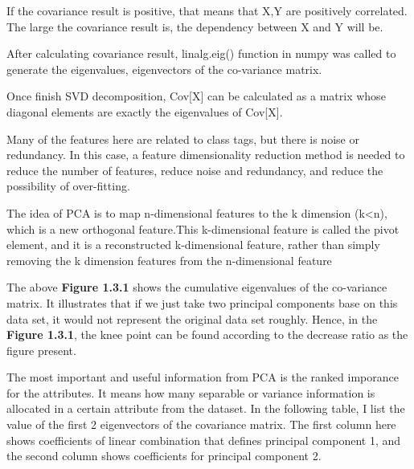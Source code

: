 \documentclass[titlepage,a4paper,12pt,thmsb]{report}
\begin{document}
If the covariance result is positive, that means that X,Y are positively correlated. The large the covariance result is, the dependency between X and Y will be.

After calculating covariance result, {linalg.eig()} function in {numpy} was called to generate the eigenvalues, eigenvectors of the co-variance matrix.

Once finish SVD decomposition, Cov[X] can be calculated as a matrix whose diagonal elements are exactly the eigenvalues of Cov[X].

Many of the features here are related to class tags, but there is noise or redundancy. In this case, a feature dimensionality reduction method is needed to reduce the number of features, reduce noise and redundancy, and reduce the possibility of over-fitting.

The idea of PCA is to map n-dimensional features to the k dimension (k<n), which is a new orthogonal feature.This k-dimensional feature is called the pivot element, and it is a reconstructed k-dimensional feature, rather than simply removing the k dimension features from the n-dimensional feature

\newpage

\begin{center}
\begin{figure}[h]
{\par}
\end{figure}
{}
\end{center}

\begin{center}
\begin{figure}[h]
{\par}
\end{figure}
{}
\end{center}

\newpage

The above  {\bf{Figure 1.3.1}} shows the cumulative eigenvalues of the co-variance matrix. It illustrates that if we just take two principal components base on this data set, it would not represent the original data set  roughly. Hence, in the {\bf{Figure 1.3.1}}, the knee point can be found according to the decrease ratio as the figure present.

The most important and useful information from PCA is the ranked imporance for the attributes.  It means how many separable or variance information is allocated in a certain attribute from the dataset.  In the following table, I list the value of the first 2 eigenvectors of the covariance matrix. The first column here shows coefficients of linear combination that defines principal component 1, and the second column shows coefficients for principal component 2. 
\end{document}
